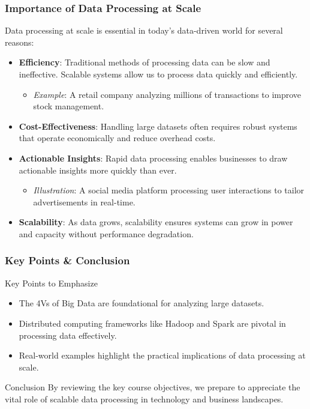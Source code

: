 \documentclass[aspectratio=169]{beamer}
\begin{document}
\begin{frame}[fragile]
    \frametitle{Importance of Data Processing at Scale}
    Data processing at scale is essential in today's data-driven world for several reasons:
    \begin{itemize}
        \item \textbf{Efficiency}:
        Traditional methods of processing data can be slow and ineffective. Scalable systems allow us to process data quickly and efficiently.
        \begin{itemize}
            \item \textit{Example}: A retail company analyzing millions of transactions to improve stock management.
        \end{itemize}
        
        \item \textbf{Cost-Effectiveness}:
        Handling large datasets often requires robust systems that operate economically and reduce overhead costs.
        
        \item \textbf{Actionable Insights}:
        Rapid data processing enables businesses to draw actionable insights more quickly than ever.
        \begin{itemize}
            \item \textit{Illustration}: A social media platform processing user interactions to tailor advertisements in real-time.
        \end{itemize}

        \item \textbf{Scalability}:
        As data grows, scalability ensures systems can grow in power and capacity without performance degradation.
    \end{itemize}
\end{frame}

\begin{frame}[fragile]
    \frametitle{Key Points & Conclusion}
    \begin{block}{Key Points to Emphasize}
        \begin{itemize}
            \item The 4Vs of Big Data are foundational for analyzing large datasets.
            \item Distributed computing frameworks like Hadoop and Spark are pivotal in processing data effectively.
            \item Real-world examples highlight the practical implications of data processing at scale.
        \end{itemize}
    \end{block}

    \begin{block}{Conclusion}
        By reviewing the key course objectives, we prepare to appreciate the vital role of scalable data processing in technology and business landscapes.
    \end{block}
\end{frame}
\end{document}
